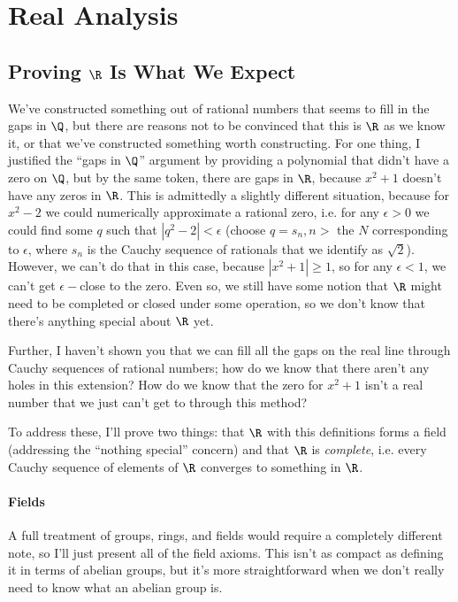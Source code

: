 \documentclass[./analysis.tex]{subfiles}
\begin{document}
    \section{Real Analysis}

    \subsection{Proving $\R$ Is What We Expect}

    We've constructed something out of rational numbers that seems to fill in the gaps in $\Q$, but there are reasons not to be convinced that this is $\R$ as we know it, or that we've constructed something worth constructing. For one thing, I justified the ``gaps in $\Q$'' argument by providing a polynomial that didn't have a zero on $\Q$, but by the same token, there are gaps in $\R$, because $x^2 + 1$ doesn't have any zeros in $\R$. This is admittedly a slightly different situation, because for $x^2 - 2$ we could numerically approximate a rational zero, i.e. for any $\epsilon > 0$ we could find some $q$ such that $|q^2 - 2| < \epsilon$ (choose $q = s_n, n > $ the $N$ corresponding to $\epsilon$, where $s_n$ is the Cauchy sequence of rationals that we identify as $\sqrt{2}$). However, we can't do that in this case, because $|x^2 + 1| \geq 1$, so for any $\epsilon < 1$, we can't get $\epsilon-$close to the zero. Even so, we still have some notion that $\R$ might need to be completed or closed under some operation, so we don't know that there's anything special about $\R$ yet.
    
    Further, I haven't shown you that we can fill all the gaps on the real line through Cauchy sequences of rational numbers; how do we know that there aren't any holes in this extension? How do we know that the zero for $x^2 + 1$ isn't a real number that we just can't get to through this method?

    To address these, I'll prove two things: that $\R$ with this definitions forms a field (addressing the ``nothing special'' concern) and that $\R$ is \emph{complete}, i.e. every Cauchy sequence of elements of $\R$ converges to something in $\R$.

    \paragraph*{Fields} A full treatment of groups, rings, and fields would require a completely different note, so I'll just present all of the field axioms. This isn't as compact as defining it in terms of abelian groups, but it's more straightforward when we don't really need to know what an abelian group is.
\end{document}
